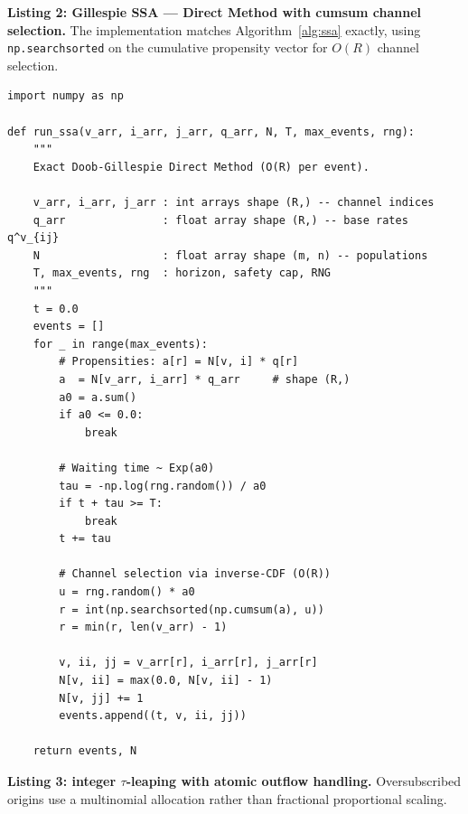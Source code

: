 \documentclass[12pt,a4paper]{article}
\theoremstyle{plain}
\theoremstyle{definition}
\theoremstyle{remark}
\begin{document}
\textbf{Listing 2: Gillespie SSA --- Direct Method with cumsum channel
selection.}
The implementation matches Algorithm~\ref{alg:ssa} exactly, using
\texttt{np.searchsorted} on the cumulative propensity vector for $O(R)$ channel
selection.

\begin{lstlisting}[caption={Gillespie SSA (\texttt{bkk/simulate.py},
  inner loop).},label={lst:ssa}]
import numpy as np

def run_ssa(v_arr, i_arr, j_arr, q_arr, N, T, max_events, rng):
    """
    Exact Doob-Gillespie Direct Method (O(R) per event).

    v_arr, i_arr, j_arr : int arrays shape (R,) -- channel indices
    q_arr               : float array shape (R,) -- base rates q^v_{ij}
    N                   : float array shape (m, n) -- populations
    T, max_events, rng  : horizon, safety cap, RNG
    """
    t = 0.0
    events = []
    for _ in range(max_events):
        # Propensities: a[r] = N[v, i] * q[r]
        a  = N[v_arr, i_arr] * q_arr     # shape (R,)
        a0 = a.sum()
        if a0 <= 0.0:
            break

        # Waiting time ~ Exp(a0)
        tau = -np.log(rng.random()) / a0
        if t + tau >= T:
            break
        t += tau

        # Channel selection via inverse-CDF (O(R))
        u = rng.random() * a0
        r = int(np.searchsorted(np.cumsum(a), u))
        r = min(r, len(v_arr) - 1)

        v, ii, jj = v_arr[r], i_arr[r], j_arr[r]
        N[v, ii] = max(0.0, N[v, ii] - 1)
        N[v, jj] += 1
        events.append((t, v, ii, jj))

    return events, N
\end{lstlisting}

\textbf{Listing 3: integer $\tau$-leaping with atomic outflow handling.}
Oversubscribed origins use a multinomial allocation rather than fractional
proportional scaling.
\end{document}
